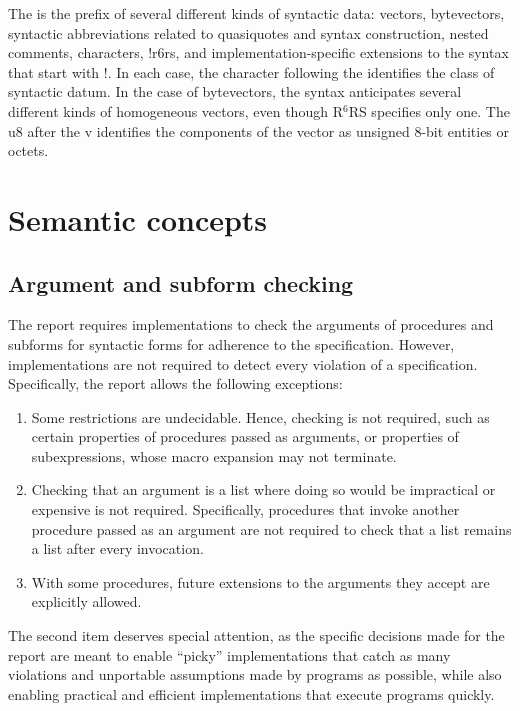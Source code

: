\documentclass[twoside,twocolumn]{algol60}
\newcommand{\rn}[1]{R$^{#1}$RS}
\begin{document}
The {\cf\sharpsign} is the prefix of several different kinds of
syntactic data: vectors, bytevectors, syntactic abbreviations related
to quasiquotes and syntax construction, nested comments, characters,
{\cf\sharpsign!r6rs}, and implementation-specific extensions to the
syntax that start with {\cf\sharpsign!}.  In each case, the character
following the {\cf\sharpsign} identifies the class of syntactic datum.
In the case of bytevectors, the syntax anticipates several different
kinds of homogeneous vectors, even though \rn{6} specifies only
one. The {\cf u8} after the {\cf\sharpsign{}v} identifies the
components of the vector as unsigned 8-bit entities or octets.


\chapter{Semantic concepts}

\section{Argument and subform checking}
\label{argumentchecking}

The report requires implementations to check the arguments of
procedures and subforms for syntactic forms for adherence to the
specification.  However, implementations are not required to detect
every violation of a specification.  Specifically, the report allows
the following exceptions:
%
\begin{enumerate}
\item Some restrictions are undecidable.  Hence, checking is not
  required, such as certain properties of procedures passed as
  arguments, or properties of subexpressions, whose macro expansion
  may not terminate.
\item Checking that an argument is a list where doing so would be
  impractical or expensive is not required.  Specifically, procedures that
  invoke another procedure passed as an argument are not required to
  check that a list remains a list after every invocation.
\item With some procedures, future extensions to the arguments they
  accept are explicitly allowed.
\end{enumerate}
%
The second item deserves special attention, as the specific decisions
made for the report are meant to enable ``picky'' implementations that
catch as many violations and unportable assumptions made by programs
as possible, while also enabling practical and efficient
implementations that execute programs quickly.
\end{document}
